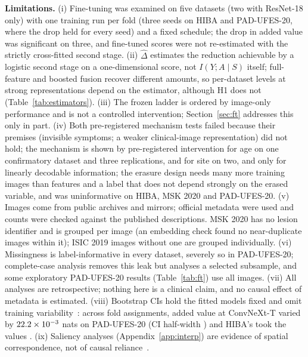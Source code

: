 \documentclass[conference]{IEEEtran}
\begin{document}
\textbf{Limitations.} (i) Fine-tuning was examined on five datasets (two with ResNet-18 only) with one training run per fold (three seeds on HIBA and PAD-UFES-20, where the drop held for every seed) and a fixed schedule; the drop in added value was significant on three, and fine-tuned scores were not re-estimated with the strictly cross-fitted second stage. (ii) $\hat\Delta$ estimates the reduction achievable by a logistic second stage on a one-dimensional score, not $I(Y;A\mid S)$ itself; full-feature and boosted fusion recover different amounts, so per-dataset levels at strong representations depend on the estimator, although H1 does not (Table~\ref{tab:estimators}). (iii) The frozen ladder is ordered by image-only performance and is not a controlled intervention; Section~\ref{sec:ft} addresses this only in part. (iv) Both pre-registered mechanism tests failed because their premises (invisible symptoms; a weaker clinical-image representation) did not hold; the mechanism is shown by pre-registered intervention for age on one confirmatory dataset and three replications, and for site on two, and only for linearly decodable information; the erasure design needs many more training images than features and a label that does not depend strongly on the erased variable, and was uninformative on HIBA, MSK 2020 and PAD-UFES-20. (v) Images come from public archives and mirrors; official metadata were used and counts were checked against the published descriptions. MSK 2020 has no lesion identifier and is grouped per image (an embedding check found no near-duplicate images within it); ISIC 2019 images without one are grouped individually. (vi) Missingness is label-informative in every dataset, severely so in PAD-UFES-20; complete-case analysis removes this leak but analyses a selected subsample, and some exploratory PAD-UFES-20 results (Table~\ref{tab:ft}) use all images. (vii) All analyses are retrospective; nothing here is a clinical claim, and no causal effect of metadata is estimated. (viii) Bootstrap CIs hold the fitted models fixed and omit training variability~\cite{bates2024cv}: across fold assignments, added value at ConvNeXt-T varied by $22.2\times10^{-3}$ nats on PAD-UFES-20 (CI half-width \SPREADpadHW{}) and HIBA's took the values \SPREADhiba{}. (ix) Saliency analyses (Appendix~\ref{app:interp}) are evidence of spatial correspondence, not of causal reliance~\cite{adebayo2018sanity}.
\end{document}
